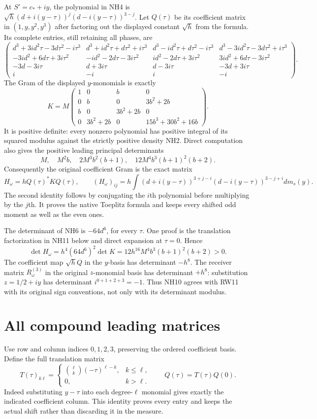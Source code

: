 \documentclass[11pt]{article}
\begin{document}
At $S'=c_*+iy$, the polynomial in NH4 is
$\sqrt h(d+i(y-\tau))^j(d-i(y-\tau))^{3-j}$.
Let $Q(\tau)$ be its coefficient matrix in $(1,y,y^2,y^3)$ after
factoring out the displayed constant $\sqrt h$ from the formula.
Its complete entries, still retaining all phases, are
\[
\begin{pmatrix}
d^3+3id^2\tau-3d\tau^2-i\tau^3&d^3+id^2\tau+d\tau^2+i\tau^3&
d^3-id^2\tau+d\tau^2-i\tau^3&d^3-3id^2\tau-3d\tau^2+i\tau^3\\
-3id^2+6d\tau+3i\tau^2&-id^2-2d\tau-3i\tau^2&
id^2-2d\tau+3i\tau^2&3id^2+6d\tau-3i\tau^2\\
-3d-3i\tau&d+3i\tau&d-3i\tau&-3d+3i\tau\\
i&-i&i&-i
\end{pmatrix}.
\tag{NH6}
\]
The Gram of the displayed $y$-monomials is exactly
\[
 K=M\begin{pmatrix}
 1&0&b&0\\0&b&0&3b^2+2b\\
 b&0&3b^2+2b&0\\0&3b^2+2b&0&15b^3+30b^2+16b
 \end{pmatrix}.
 \tag{NH7}
\]
It is positive definite: every nonzero polynomial has positive
integral of its squared modulus against the strictly positive
density NH2. Direct computation also gives the positive leading
principal determinants
\[
 M,\quad M^2b,\quad2M^3b^2(b+1),\quad
 12M^4b^3(b+1)^2(b+2).
 \tag{NH8}
\]
Consequently the original coefficient Gram is the exact matrix
\[
 H_\omega=hQ(\tau)^*KQ(\tau),\qquad
 (H_\omega)_{ij}=h\int(d+i(y-\tau))^{3+j-i}
                      (d-i(y-\tau))^{3-j+i}dm_s(y).
 \tag{NH9}
\]
The second identity follows by conjugating the $i$th polynomial
before multiplying by the $j$th. It proves the native Toeplitz
formula and keeps every shifted odd moment as well as the even ones.

The determinant of NH6 is $-64d^6$, for every $\tau$.
One proof is the translation factorization in NH11 below and
direct expansion at $\tau=0$. Hence
\[
 \det H_\omega
 =h^4(64d^6)^2\det K
 =12h^{16}M^4b^3(b+1)^2(b+2)>0.
 \tag{NH10}
\]
The coefficient map $\sqrt h Q$ in the $y$-basis has determinant
$-h^8$. The receiver matrix $R_\omega^{(3)}$ in the original
$z$-monomial basis has determinant $+h^8$: substitution
$z=1/2+iy$ has determinant $i^{0+1+2+3}=-1$. Thus NH10
agrees with RW11 with its original sign conventions, not only
with its determinant modulus.

\section{All compound leading matrices}
Use row and column indices $0,1,2,3$, preserving the ordered
coefficient basis. Define the full translation matrix
\[
 T(\tau)_{k\ell}=\begin{cases}
 \binom\ell k(-\tau)^{\ell-k},&k\le\ell,\\0,&k>\ell.
 \end{cases}
 \qquad Q(\tau)=T(\tau)Q(0).
 \tag{NH11}
\]
Indeed substituting $y-\tau$ into each degree-$\ell$ monomial
gives exactly the indicated coefficient column. This identity
proves every entry and keeps the actual shift rather than discarding
it in the measure.
\end{document}
